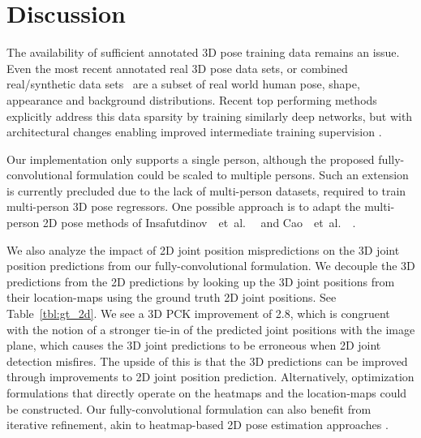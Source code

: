 \documentclass[acmtog]{acmart}
\newcommand{\etal}{~et~al.\ }
\newcommand{\change}[1]{{#1}}
\begin{document}
\section{Discussion}   
The availability of sufficient annotated 3D pose training data \change{remains an issue. Even the most recent} annotated real 3D pose data sets, or combined real/synthetic data sets~\cite{chen_synth_data_3dv16,ionescu_human36_pami14,mehta_mlc3d_arxiv16} are a subset of real world human pose, shape, appearance and background distributions.
Recent top performing methods explicitly address this data sparsity by training similarly deep networks, but with architectural changes enabling improved intermediate training supervision \cite{mehta_mlc3d_arxiv16}.

Our implementation only supports a single person, although the proposed fully-convolutional formulation could be scaled to multiple persons. Such an extension is currently precluded due to the lack of multi-person datasets, required to train multi-person 3D pose regressors. One possible approach is to adapt the multi-person 2D pose methods of Insafutdinov~\etal~ and Cao~\etal~.

We also analyze the impact of 2D joint position mispredictions on the 3D joint position predictions from our fully-convolutional formulation. We decouple the 3D predictions from the 2D predictions by looking up the 3D joint positions from their location-maps using the ground truth 2D joint positions. See Table~\ref{tbl:gt_2d}. We see a 3D PCK improvement of 2.8, which is congruent with the notion of a stronger tie-in of the predicted joint positions with the image plane, which causes the 3D joint predictions to be erroneous when 2D joint detection misfires. The upside of this is that the 3D predictions can be improved through improvements to 2D joint position prediction. Alternatively, optimization formulations that directly operate on the heatmaps and the location-maps could be constructed.
Our fully-convolutional formulation can also benefit from iterative refinement, akin to heatmap-based 2D pose estimation approaches \cite{newell_stacked_hourglass_eccv16,hu_bottomup_cvpr16}.
\end{document}
